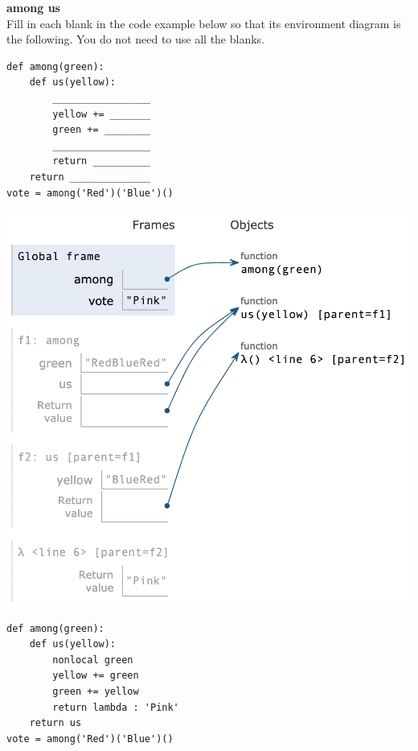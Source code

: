 \begin{blocksection}
\question
\textbf{among us}\\
Fill in each blank in the code example below so that its environment diagram is the following. You do not need to use all the blanks.

\begin{multicols}{2}
\begin{lstlisting}
def among(green):
    def us(yellow):
        _________________
        yellow += _______
        green += ________
        _________________
        return __________
    return ______________
vote = among('Red')('Blue')()
\end{lstlisting}

\columnbreak
\includegraphics[width=.45\textwidth]{amongus.png}
\end{multicols}

\begin{solution}[2in]
\begin{lstlisting}
def among(green):
    def us(yellow):
        nonlocal green
        yellow += green
        green += yellow
        return lambda : 'Pink'
    return us
vote = among('Red')('Blue')()
\end{lstlisting}
\end{solution}
\end{blocksection}

